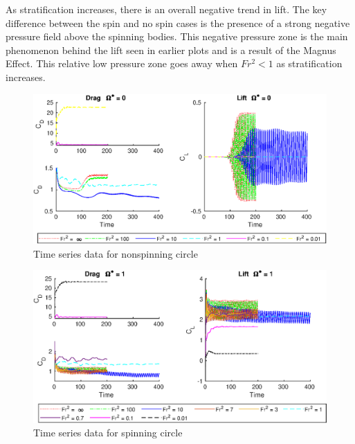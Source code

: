 As stratification increases, there is an overall negative trend in lift. The key difference between the spin and no spin cases is the presence of a strong negative pressure field above the spinning bodies. This negative pressure zone is the main phenomenon behind the lift seen in earlier plots and is a result of the Magnus Effect. This relative low pressure zone goes away when $Fr^2 < 1$ as stratification increases. 
\begin{figure}
    \centerline{\includegraphics[width=\textwidth]{images/circle/timens.eps}}
    \caption{Time series data for nonspinning circle}
    \label{fig:timens}
\end{figure}
\begin{figure}
    \centerline{\includegraphics[width=\textwidth]{images/circle/times.eps}}
    \caption{Time series data for spinning circle}
    \label{fig:times}
\end{figure}


